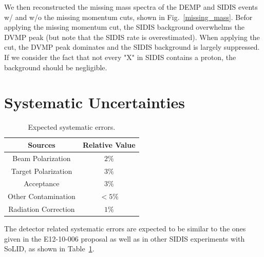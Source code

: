 We then reconstructed the missing mass spectra of the DEMP and SIDIS events w/ and w/o the missing momentum cuts, shown in Fig.~\ref{missing_mass}. Befor applying the missing momentum cut, the SIDIS background overwhelms the DVMP peak (but note that the SIDIS rate is overestimated). When applying the cut, the DVMP peak dominates and the SIDIS background is largely suppressed. If we consider the fact that not every "X" in SIDIS contains a proton, the background should be negligible. 

\section{Systematic Uncertainties}
\begin{table}[!htp]
\centering
\begin{tabular}{|c|c|}
\hline
{\bf Sources}                  & {\bf Relative Value} \\\hline
Beam Polarization         & $2\%$ \\\hline 
Target Polarization         & $3\%$ \\\hline 
Acceptance                    & $3\%$ \\\hline
Other Contamination      & $<5\%$ \\\hline
Radiation Correction      & $1\%$ \\\hline
\end{tabular}
\caption{\footnotesize{Expected systematic errors.}}\label{table:det_sys_err}
\end{table}
The detector related systematic errors are expected to be similar to the ones
given in the E12-10-006 proposal as well as in other SIDIS experiments with
SoLID, as shown in Table~\ref{table:det_sys_err}. 
